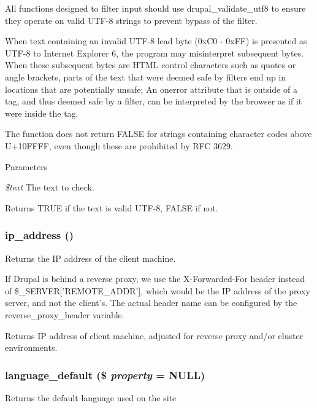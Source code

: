 All functions designed to filter input should use drupal\_\-validate\_\-utf8 to ensure they operate on valid UTF-\/8 strings to prevent bypass of the filter.

When text containing an invalid UTF-\/8 lead byte (0xC0 -\/ 0xFF) is presented as UTF-\/8 to Internet Explorer 6, the program may misinterpret subsequent bytes. When these subsequent bytes are HTML control characters such as quotes or angle brackets, parts of the text that were deemed safe by filters end up in locations that are potentially unsafe; An onerror attribute that is outside of a tag, and thus deemed safe by a filter, can be interpreted by the browser as if it were inside the tag.

The function does not return FALSE for strings containing character codes above U+10FFFF, even though these are prohibited by RFC 3629.


\begin{DoxyParams}{Parameters}
\item[{\em \$text}]The text to check.\end{DoxyParams}
\begin{DoxyReturn}{Returns}
TRUE if the text is valid UTF-\/8, FALSE if not. 
\end{DoxyReturn}
\hypertarget{bootstrap_8inc_aec2f772317b4fb79cc696412c2e455c3}{
\subsubsection[{ip\_\-address}]{\setlength{\rightskip}{0pt plus 5cm}ip\_\-address ()}}
\label{bootstrap_8inc_aec2f772317b4fb79cc696412c2e455c3}
Returns the IP address of the client machine.

If Drupal is behind a reverse proxy, we use the X-\/Forwarded-\/For header instead of \$\_\-SERVER\mbox{[}'REMOTE\_\-ADDR'\mbox{]}, which would be the IP address of the proxy server, and not the client's. The actual header name can be configured by the reverse\_\-proxy\_\-header variable.

\begin{DoxyReturn}{Returns}
IP address of client machine, adjusted for reverse proxy and/or cluster environments. 
\end{DoxyReturn}
\hypertarget{bootstrap_8inc_a336c0878074791056c62640cd95d8067}{
\subsubsection[{language\_\-default}]{\setlength{\rightskip}{0pt plus 5cm}language\_\-default (\$ {\em property} = {\ttfamily NULL})}}
\label{bootstrap_8inc_a336c0878074791056c62640cd95d8067}
Returns the default language used on the site


